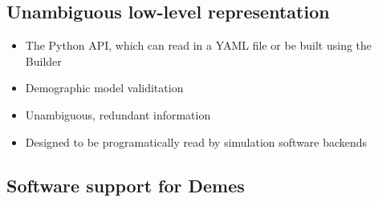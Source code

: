 \documentclass[11pt]{article}
\newenvironment{code}{\captionsetup{type=listing}\centering}{}
\newcommand{\msprime}[0]{\texttt{msprime}}
\newcommand{\stdpopsim}[0]{\texttt{stdpopsim}}
\newcommand{\moments}[0]{\texttt{moments}}
\newcommand{\dadi}[0]{\texttt{$\partial$a$\partial$i}}
\newcommand{\fwdpy}[0]{\texttt{fwdpy11}}
\newcommand{\gadma}[0]{\texttt{GADMA}}
\newcommand{\jkcomment}[1]{{\textcolor{red}{JK: #1}}}
\begin{document}
\begin{code}
\begin{tcolorbox}
\inputminted[linenos,numbersep=5pt]{yaml}{models/IM.yaml}
\end{tcolorbox}
\label{code:im_model}
\end{code}

\subsection*{Unambiguous low-level representation}

\begin{itemize}
    \item The Python API, which can read in a YAML file or be built using the
        Builder
    \item Demographic model validitation
    \item Unambiguous, redundant information
    \item Designed to be programatically read by simulation software backends
\end{itemize}



\subsection*{Software support for Demes}
\end{document}
